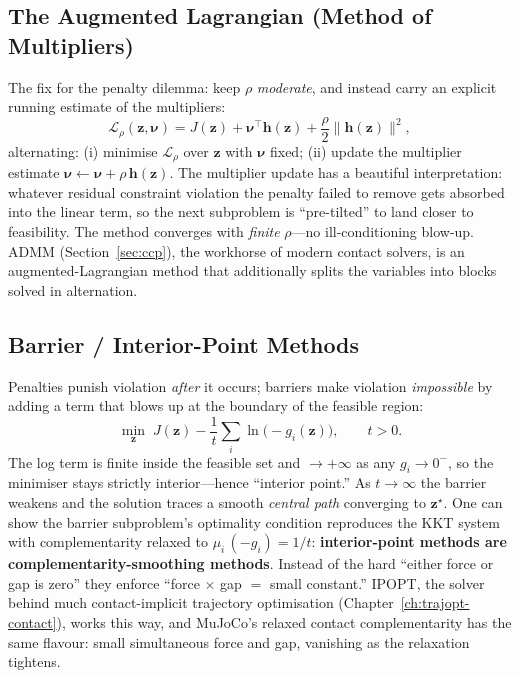 \documentclass[11pt,twoside]{report}
\theoremstyle{definition}
\theoremstyle{plain}
\theoremstyle{remark}
\newcommand{\0}{\bm{0}}
\begin{document}
\subsection{The Augmented Lagrangian (Method of Multipliers)}
The fix for the penalty dilemma: keep $\rho$ \emph{moderate}, and
instead carry an explicit running estimate of the multipliers:
\begin{equation}\label{eq:auglag}
\mathcal{L}_{\rho}(\bm{z},\bm{\nu})
=J(\bm{z})+\bm{\nu}^{\!\top}\bm{h}(\bm{z})
+\frac{\rho}{2}\|\bm{h}(\bm{z})\|^{2},
\end{equation}
alternating: (i) minimise $\mathcal{L}_{\rho}$ over $\bm{z}$ with
$\bm{\nu}$ fixed; (ii) update the multiplier estimate
$\bm{\nu}\leftarrow\bm{\nu}+\rho\,\bm{h}(\bm{z})$.
The multiplier update has a beautiful interpretation: whatever residual
constraint violation the penalty failed to remove gets absorbed into the
linear term, so the next subproblem is ``pre-tilted'' to land closer to
feasibility. The method converges with \emph{finite} $\rho$---no
ill-conditioning blow-up. ADMM (Section~\ref{sec:ccp}), the workhorse of
modern contact solvers, is an augmented-Lagrangian method that
additionally splits the variables into blocks solved in alternation.

\subsection{Barrier / Interior-Point Methods}
Penalties punish violation \emph{after} it occurs; barriers make
violation \emph{impossible} by adding a term that blows up at the
boundary of the feasible region:
\begin{equation}\label{eq:barrier}
\min_{\bm{z}}\;J(\bm{z})-\frac{1}{t}\sum_{i}\ln\bigl(-g_{i}(\bm{z})\bigr),
\qquad t>0.
\end{equation}
The log term is finite inside the feasible set and $\to+\infty$ as any
$g_{i}\to 0^{-}$, so the minimiser stays strictly interior---hence
``interior point.'' As $t\to\infty$ the barrier weakens and the solution
traces a smooth \emph{central path} converging to $\bm{z}^{\star}$.
One can show the barrier subproblem's optimality condition reproduces
the KKT system with complementarity relaxed to
$\mu_{i}\,(-g_{i})=1/t$: \textbf{interior-point methods are
complementarity-smoothing methods}. Instead of the hard ``either force
or gap is zero'' they enforce ``force $\times$ gap $=$ small constant.''
IPOPT, the solver behind much contact-implicit trajectory optimisation
(Chapter~\ref{ch:trajopt-contact}), works this way, and MuJoCo's relaxed
contact complementarity has the same flavour: small simultaneous force
and gap, vanishing as the relaxation tightens.
\end{document}
